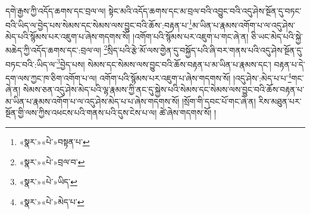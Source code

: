 དགེ་རྒྱས་ཀྱི་འདོད་ཆགས་དང་བྲལ་ལ། སྟེང་མའི་འདོད་ཆགས་དང་མ་བྲལ་བའི་འབྱུང་བའི་འདུ་ཤེས་སྔོན་དུ་བཏང་བའི་ཡིད་ལ་བྱེད་པས་སེམས་དང་སེམས་ལས་བྱུང་བའི་ཆོས་:བརྟན་པ་\footnote{«སྣར་»«པེ་»བསྟན་པ་}མ་ཡིན་པ་རྣམས་འགོག་པ་ལ་འདུ་ཤེས་མེད་པའི་སྙོམས་པར་འཇུག་པ་ཞེས་གདགས་སོ། །འགོག་པའི་སྙོམས་པར་འཇུག་པ་གང་ཞེ་ན། ཅི་ཡང་མེད་པའི་སྐྱེ་མཆེད་ཀྱི་འདོད་ཆགས་དང་:བྲལ་ལ། \footnote{«སྣར་»«པེ་»བྲལ་བ་}སྲིད་པའི་རྩེ་མོ་ལས་གྱེན་དུ་བསྐྱོད་པའི་ཞི་བར་གནས་པའི་འདུ་ཤེས་སྔོན་དུ་བཏང་བའི་:ཡིད་ལ་\footnote{«སྣར་»«པེ་»ཡིད་}བྱེད་པས། སེམས་དང་སེམས་ལས་བྱུང་བའི་ཆོས་བརྟན་པ་མ་ཡིན་པ་རྣམས་དང་། བརྟན་པ་དེ་དག་ལས་ཀྱང་ཁ་ཅིག་འགོག་པ་ལ། འགོག་པའི་སྙོམས་པར་འཇུག་པ་ཞེས་གདགས་སོ། །འདུ་ཤེས་:མེད་པ་པ་\footnote{«སྣར་»«པེ་»མེད་པ་}གང་ཞེ་ན། སེམས་ཅན་འདུ་ཤེས་མེད་པའི་ལྷ་རྣམས་ཀྱི་ནང་དུ་སྐྱེས་པའི་སེམས་དང་སེམས་ལས་བྱུང་བའི་ཆོས་བརྟན་པ་མ་ཡིན་པ་རྣམས་འགོག་པ་ལ་འདུ་ཤེས་མེད་པ་པ་ཞེས་གདགས་སོ། །སྲོག་གི་དབང་པོ་གང་ཞེ་ན། རིས་མཐུན་པར་སྔོན་གྱི་ལས་ཀྱིས་འཕངས་པའི་གནས་པའི་དུས་ངེས་པ་ལ། ཚེ་ཞེས་གདགས་སོ། །
